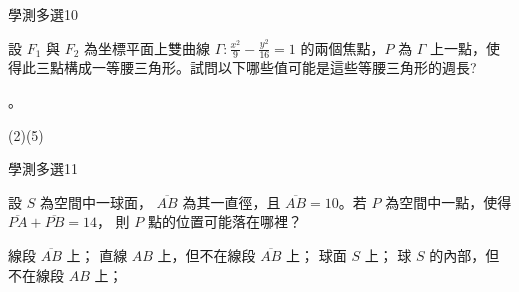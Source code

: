 \begin{QUESTIONS}
\begin{QUESTION}
        \begin{QEMPTYSPACE}
        \end{QEMPTYSPACE}
    \end{QUESTION}
    \begin{QUESTION}
        \begin{ExamInfo}{94}{學測}{多選}{10}
        \end{ExamInfo}
        \begin{ExamAnsRateInfo}{29}{47}{23}{17}
        \end{ExamAnsRateInfo}
        \begin{QBODY}
            設 $F_1$ 與 $F_2$ 為坐標平面上雙曲線 $\Gamma : \frac{x^2}{9} -\frac{y^2}{16} =1$ 的兩個焦點，$P$ 為 $\Gamma$ 上一點，使得此三點構成一等腰三角形。試問以下哪些值可能是這些等腰三角形的週長? 
			\begin{QOPS} 
				 。
			\end{QOPS}
        \end{QBODY}
        \begin{QFROMS}
        \end{QFROMS}
        \begin{QTAGS}\end{QTAGS}
        \begin{QANS}
            (2)(5)
        \end{QANS}
        \begin{QSOLLIST}
        \end{QSOLLIST}
        \begin{QEMPTYSPACE}
        \end{QEMPTYSPACE}
    \end{QUESTION}
    \begin{QUESTION}
        \begin{ExamInfo}{94}{學測}{多選}{11}
        \end{ExamInfo}
        \begin{ExamAnsRateInfo}{32}{51}{30}{15}
        \end{ExamAnsRateInfo}
        \begin{QBODY}
            設 $S$ 為空間中一球面， $\overline{AB}$ 為其一直徑，且 $\overline{AB} =10$。若 $ P$ 為空間中一點，使得 $\overline{PA} + \overline{PB} = 14$， 則 $P$ 點的位置可能落在哪裡？ 
			\begin{QOPS} 
				\QOP 線段 $\overline{AB}$ 上； 
				\QOP 直線 $AB$ 上，但不在線段 $\overline{AB}$ 上； 
				\QOP	球面 $S$ 上； 
				\QOP 球 $S$ 的內部，但不在線段 $AB$ 上； 

\end{QOPS}
\end{QBODY}
\end{QUESTION}
\end{QUESTIONS}
